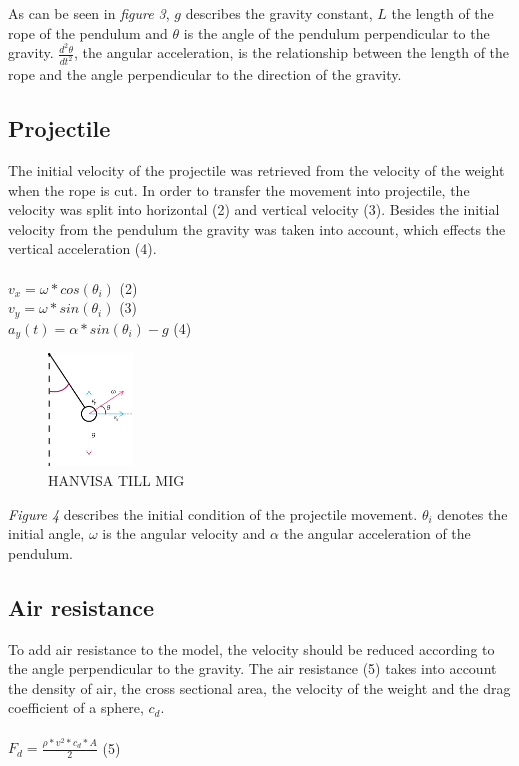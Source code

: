 \documentclass[a4paper,12pt,twoside,english]{article}
\begin{document}
As can be seen in \textit{figure 3}, $g$ describes the gravity constant, $L$ the length of the rope of the pendulum and $\theta$ is the angle of the pendulum perpendicular to the gravity.  $\frac{d^2\theta}{dt^2}$, the angular acceleration, is the relationship between the length of the rope and the angle perpendicular to the direction of the gravity. 

\subsection{Projectile}
The initial velocity of the projectile was retrieved from the velocity of the weight when the rope is cut. In order to transfer the movement into projectile, the velocity was split into horizontal (2) and vertical velocity (3). Besides the initial velocity from the pendulum the gravity was taken into account, which effects the vertical acceleration (4). \\ \\
$v_x = \omega * cos(\theta_i)$ \hfill (2) \\
$v_y = \omega * sin(\theta_i)$ \hfill (3) \\
$a_y(t) = \alpha * sin(\theta_i) - g$ \hfill (4) \\

\begin{figure}[h]
\centering
\includegraphics[height=3cm]{projectile_dynamics.png}
\caption{HANVISA TILL MIG}
\end{figure}

\textit{Figure 4} describes the initial condition of the projectile movement. $\theta_i $ denotes the initial angle, $\omega$ is the angular velocity and $\alpha$ the angular acceleration of the pendulum.
\subsection{Air resistance}
To add air resistance to the model, the velocity should be reduced according to the angle perpendicular to the gravity. The air resistance (5) takes into account the density of air, the cross sectional area, the velocity of the weight and the drag coefficient of a sphere, $c_{d}$.\\ \\
$F_{d} = \frac{ \rho * v^2 * c_{d} * A}{2} $ \hfill (5) 
\end{document}
